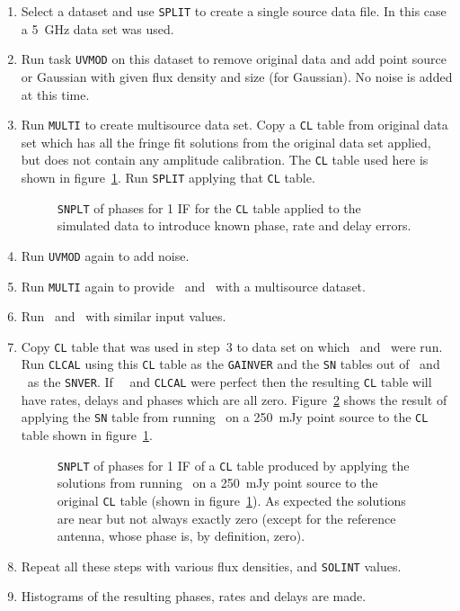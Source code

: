 \begin{enumerate}

\item Select a dataset and use {\tt SPLIT} to create a single
source data file.  In this case a 5~GHz data set was used.

\item Run task {\tt UVMOD} on this dataset to remove original data
and add point source or Gaussian with given flux density and size (for
Gaussian).  No noise is added at this time.

\item Run {\tt MULTI} to create multisource data set.  Copy a {\tt CL} table
from original data set which has all the fringe fit solutions from the
original data set applied, but does not contain any amplitude calibration.
The {\tt CL} table used here is shown in figure~\ref{snplt}\@.  Run {\tt SPLIT}
applying that {\tt CL} table.

\begin{figure}[t!]
\caption{{\tt SNPLT} of phases for 1 IF  for the {\tt CL} table
applied to the simulated data to introduce known phase, rate and delay
errors.}
\label{snplt}
\end{figure}

\item Run {\tt UVMOD} again to add noise.

\item Run {\tt MULTI} again to provide \KR\ and \FR\ with a multisource
dataset.

\item Run \KR\ and \FR\ with similar input values.

\item Copy {\tt CL} table that was used in step~3 to data
set on which \KR\ and \FR\ were run. Run {\tt CLCAL} using this
{\tt CL} table as the {\tt GAINVER} and the {\tt SN} tables out of
\KR\ and \FR\ as the {\tt SNVER}.  If \KR\, \FR\ and
{\tt CLCAL} were perfect then the resulting {\tt CL} table will have
rates, delays and phases which are all zero.  Figure~\ref{snplt2} shows
the result of applying the {\tt SN} table from running \KR\ on a 250~mJy
point source to the {\tt CL} table shown in figure~\ref{snplt}\@.

\begin{figure}[t!]
\caption{{\tt SNPLT} of phases for 1 IF of a {\tt CL} table
produced by applying the solutions from running \KR\ on a 250~mJy point
source to the original {\tt CL} table (shown in figure~\ref{snplt})\@.
As expected the solutions are near but not always exactly zero (except
for the reference antenna, whose phase is, by definition, zero).}
\label{snplt2}
\end{figure}

\item Repeat all these steps with various flux densities, and {\tt SOLINT}
values.

\item Histograms of the resulting phases, rates and delays are made.

\end{enumerate}

